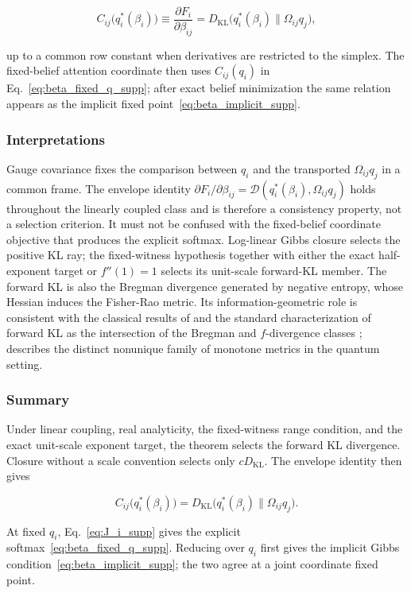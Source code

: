 \documentclass[twoside,11pt]{article}
\begin{document}
\begin{equation}
C_{ij}\bigl(q_i^*(\beta_i)\bigr)
\equiv \frac{\partial F_i}{\partial\beta_{ij}}
= D_{\mathrm{KL}}\bigl(q_i^*(\beta_i) \| \Omega_{ij}q_j\bigr),
\end{equation}

up to a common row constant when derivatives are restricted to the simplex. The fixed-belief attention coordinate then uses $C_{ij}(q_i)$ in Eq.~\eqref{eq:beta_fixed_q_supp}; after exact belief minimization the same relation appears as the implicit fixed point~\eqref{eq:beta_implicit_supp}.

\subsubsection{Interpretations}
Gauge covariance fixes the comparison between $q_i$ and the transported $\Omega_{ij}q_j$ in a common frame. The envelope identity $\partial F_i/\partial\beta_{ij}=\mathcal D(q_i^*(\beta_i),\Omega_{ij}q_j)$ holds throughout the linearly coupled class and is therefore a consistency property, not a selection criterion. It must not be confused with the fixed-belief coordinate objective that produces the explicit softmax. Log-linear Gibbs closure selects the positive KL ray; the fixed-witness hypothesis together with either the exact half-exponent target or $f''(1)=1$ selects its unit-scale forward-KL member. The forward KL is also the Bregman divergence generated by negative entropy, whose Hessian induces the Fisher-Rao metric. Its information-geometric role is consistent with the classical results of \citet{Cencov1982} and the standard characterization of forward KL as the intersection of the Bregman and $f$-divergence classes \citep{Amari2016}; \citet{Petz1996} describes the distinct nonunique family of monotone metrics in the quantum setting.

\subsubsection{Summary}
Under linear coupling, real analyticity, the fixed-witness range condition, and the exact unit-scale exponent target, the theorem selects the forward KL divergence. Closure without a scale convention selects only $cD_{\mathrm{KL}}$. The envelope identity then gives

\[
\boxed{
C_{ij}\bigl(q_i^*(\beta_i)\bigr)
=D_{\mathrm{KL}}\bigl(q_i^*(\beta_i) \| \Omega_{ij} q_j\bigr)}.
\]

At fixed $q_i$, Eq.~\eqref{eq:J_i_supp} gives the explicit softmax~\eqref{eq:beta_fixed_q_supp}. Reducing over $q_i$ first gives the implicit Gibbs condition~\eqref{eq:beta_implicit_supp}; the two agree at a joint coordinate fixed point.
\end{document}

